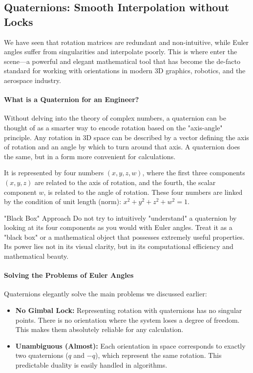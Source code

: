 \subsection{Quaternions: Smooth Interpolation without Locks}
\label{sec:quaternions}

We have seen that rotation matrices are redundant and non-intuitive, while Euler angles suffer from singularities and interpolate poorly. This is where  enter the scene—a powerful and elegant mathematical tool that has become the de-facto standard for working with orientations in modern 3D graphics, robotics, and the aerospace industry.

\paragraph{What is a Quaternion for an Engineer?}
Without delving into the theory of complex numbers, a quaternion can be thought of as a smarter way to encode rotation based on the "axis-angle" principle. Any rotation in 3D space can be described by a vector defining the axis of rotation and an angle by which to turn around that axis. A quaternion does the same, but in a form more convenient for calculations.

It is represented by four numbers $(x, y, z, w)$, where the first three components $(x, y, z)$ are related to the axis of rotation, and the fourth, the scalar component $w$, is related to the angle of rotation. These four numbers are linked by the condition of unit length (norm): $x^2 + y^2 + z^2 + w^2 = 1$.

\begin{tipbox}{"Black Box" Approach}
Do not try to intuitively "understand" a quaternion by looking at its four components as you would with Euler angles. Treat it as a "black box" or a mathematical object that possesses extremely useful properties. Its power lies not in its visual clarity, but in its computational efficiency and mathematical beauty.
\end{tipbox}

\paragraph{Solving the Problems of Euler Angles}
Quaternions elegantly solve the main problems we discussed earlier:
\begin{itemize}
    \item \textbf{No Gimbal Lock:} Representing rotation with quaternions has no singular points. There is no orientation where the system loses a degree of freedom. This makes them absolutely reliable for any calculation.
    \item \textbf{Unambiguous (Almost):} Each orientation in space corresponds to exactly two quaternions ($q$ and $-q$), which represent the same rotation. This predictable duality is easily handled in algorithms.
\end{itemize}

